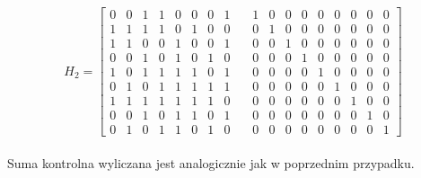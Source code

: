 \documentclass[a4paper, portrait,11pt]{article}
\begin{document}
$$H_2 = \left[\begin{array}{cccccccccccccccccc}
0 & 0 & 1 & 1 & 0 & 0 & 0 & 1 & \, & 1 & 0 & 0 & 0 & 0 & 0 & 0 & 0 & 0 \\
1 & 1 & 1 & 1 & 0 & 1 & 0 & 0 & \, & 0 & 1 & 0 & 0 & 0 & 0 & 0 & 0 & 0 \\
1 & 1 & 0 & 0 & 1 & 0 & 0 & 1 & \, & 0 & 0 & 1 & 0 & 0 & 0 & 0 & 0 & 0 \\
0 & 0 & 1 & 0 & 1 & 0 & 1 & 0 & \, & 0 & 0 & 0 & 1 & 0 & 0 & 0 & 0 & 0 \\
1 & 0 & 1 & 1 & 1 & 1 & 0 & 1 & \, & 0 & 0 & 0 & 0 & 1 & 0 & 0 & 0 & 0 \\
0 & 1 & 0 & 1 & 1 & 1 & 1 & 1 & \, & 0 & 0 & 0 & 0 & 0 & 1 & 0 & 0 & 0 \\
1 & 1 & 1 & 1 & 1 & 1 & 1 & 0 & \, & 0 & 0 & 0 & 0 & 0 & 0 & 1 & 0 & 0 \\
0 & 0 & 1 & 0 & 1 & 1 & 0 & 1 & \, & 0 & 0 & 0 & 0 & 0 & 0 & 0 & 1 & 0 \\
0 & 1 & 0 & 1 & 1 & 0 & 1 & 0 & \, & 0 & 0 & 0 & 0 & 0 & 0 & 0 & 0 & 1
\end{array}\right]$$
\\
Suma kontrolna wyliczana jest analogicznie jak w poprzednim przypadku.
\end{document}
